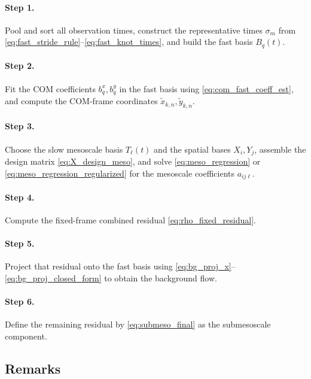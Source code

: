 \paragraph{Step 1.}
Pool and sort all observation times, construct the representative times
$\sigma_m$ from \eqref{eq:fast_stride_rule}--\eqref{eq:fast_knot_times}, and build the fast
basis $B_q(t)$.

\paragraph{Step 2.}
Fit the COM coefficients $b_q^x,b_q^y$ in the fast basis using
\eqref{eq:com_fast_coeff_est}, and compute the COM-frame coordinates
$\tilde{x}_{k,n},\tilde{y}_{k,n}$.

\paragraph{Step 3.}
Choose the slow mesoscale basis $T_\ell(t)$ and the spatial bases $X_i,Y_j$, assemble the
design matrix \eqref{eq:X_design_meso}, and solve
\eqref{eq:meso_regression} or \eqref{eq:meso_regression_regularized} for the mesoscale
coefficients $a_{ij\ell}$.

\paragraph{Step 4.}
Compute the fixed-frame combined residual \eqref{eq:rho_fixed_residual}.

\paragraph{Step 5.}
Project that residual onto the fast basis using \eqref{eq:bg_proj_x}--\eqref{eq:bg_proj_closed_form}
to obtain the background flow.

\paragraph{Step 6.}
Define the remaining residual by \eqref{eq:submeso_final} as the submesoscale component.

\subsection{Remarks}

